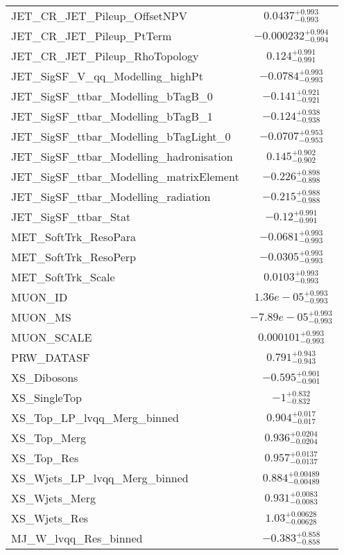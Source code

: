 \begin{tabular}{|l|c|}
JET\_CR\_JET\_Pileup\_OffsetNPV & $0.0437^{+0.993}_{-0.993}$ \\
JET\_CR\_JET\_Pileup\_PtTerm & $-0.000232^{+0.994}_{-0.994}$ \\
JET\_CR\_JET\_Pileup\_RhoTopology & $0.124^{+0.991}_{-0.991}$ \\
JET\_SigSF\_V\_qq\_Modelling\_highPt & $-0.0784^{+0.993}_{-0.993}$ \\
JET\_SigSF\_ttbar\_Modelling\_bTagB\_0 & $-0.141^{+0.921}_{-0.921}$ \\
JET\_SigSF\_ttbar\_Modelling\_bTagB\_1 & $-0.124^{+0.938}_{-0.938}$ \\
JET\_SigSF\_ttbar\_Modelling\_bTagLight\_0 & $-0.0707^{+0.953}_{-0.953}$ \\
JET\_SigSF\_ttbar\_Modelling\_hadronisation & $0.145^{+0.902}_{-0.902}$ \\
JET\_SigSF\_ttbar\_Modelling\_matrixElement & $-0.226^{+0.898}_{-0.898}$ \\
JET\_SigSF\_ttbar\_Modelling\_radiation & $-0.215^{+0.988}_{-0.988}$ \\
JET\_SigSF\_ttbar\_Stat & $-0.12^{+0.991}_{-0.991}$ \\
MET\_SoftTrk\_ResoPara & $-0.0681^{+0.993}_{-0.993}$ \\
MET\_SoftTrk\_ResoPerp & $-0.0305^{+0.993}_{-0.993}$ \\
MET\_SoftTrk\_Scale & $0.0103^{+0.993}_{-0.993}$ \\
MUON\_ID & $1.36e-05^{+0.993}_{-0.993}$ \\
MUON\_MS & $-7.89e-05^{+0.993}_{-0.993}$ \\
MUON\_SCALE & $0.000101^{+0.993}_{-0.993}$ \\
PRW\_DATASF & $0.791^{+0.943}_{-0.943}$ \\
XS\_Dibosons & $-0.595^{+0.901}_{-0.901}$ \\
XS\_SingleTop & $-1^{+0.832}_{-0.832}$ \\
XS\_Top\_LP\_lvqq\_Merg\_binned & $0.904^{+0.017}_{-0.017}$ \\
XS\_Top\_Merg & $0.936^{+0.0204}_{-0.0204}$ \\
XS\_Top\_Res & $0.957^{+0.0137}_{-0.0137}$ \\
XS\_Wjets\_LP\_lvqq\_Merg\_binned & $0.884^{+0.00489}_{-0.00489}$ \\
XS\_Wjets\_Merg & $0.931^{+0.0083}_{-0.0083}$ \\
XS\_Wjets\_Res & $1.03^{+0.00628}_{-0.00628}$ \\
MJ\_W\_lvqq\_Res\_binned & $-0.383^{+0.858}_{-0.858}$ \\

\end{tabular}
